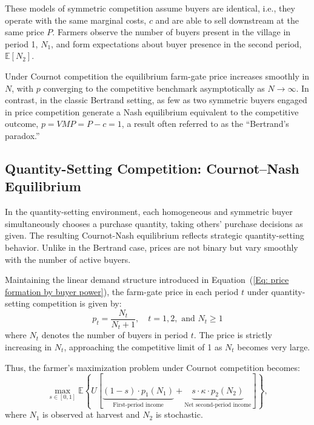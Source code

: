 These models of symmetric competition assume buyers are identical, i.e., they operate with the same marginal costs, $c$ and are able to sell downstream at the same price $P$. Farmers observe the number of buyers present in the village in period 1, $N_1$, and form expectations about buyer presence in the second period, $\mathbb{E}[N_2]$.

Under Cournot competition the equilibrium farm-gate price increases smoothly in $N$, with $p$ converging to the competitive benchmark asymptotically as $N \to \infty$. In contrast, in the classic Bertrand setting, as few as two symmetric buyers engaged in price competition generate a Nash equilibrium equivalent to the competitive outcome, $p = VMP= P-c=1$, a result often referred to as the ``Bertrand's paradox.''



\subsection{Quantity-Setting Competition: Cournot--Nash Equilibrium}
\noindent In the quantity-setting environment, each homogeneous and symmetric buyer simultaneously chooses a purchase quantity, taking others' purchase decisions as given. The resulting Cournot-Nash equilibrium reflects strategic quantity-setting behavior. Unlike in the Bertrand case, prices are not binary but vary smoothly with the number of active buyers.

Maintaining the linear demand structure introduced in Equation~(\ref{Eq: price formation by buyer power}), the farm-gate price in each period $t$ under quantity-setting competition is given by:
\begin{equation}
p_t = \frac{N_t}{N_t + 1}, \quad t = 1,2, \text{ and } N_t \geq 1
\end{equation}
where $N_t$ denotes the number of buyers in period $t$. The price is strictly increasing in $N_t$, approaching the competitive limit of 1 as $N_t$ becomes very large.

Thus, the farmer's maximization problem under Cournot competition becomes:
\begin{equation}
\label{eq:Cournot objective function}
\max_{s \in [0,1]} \mathbb{E} \left\{ U \left[ 
\underbrace{(1-s) \cdot p_1(N_1)}_{\text{First-period income}} 
+ \underbrace{s \cdot \kappa \cdot p_2(N_2)}_{\text{Net second-period income}} 
\right] \right\},
\end{equation}
where $N_1$ is observed at harvest and $N_2$ is stochastic. 

